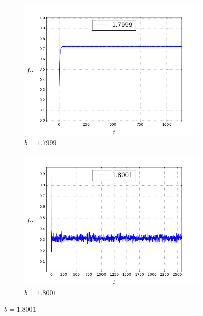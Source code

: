 \documentclass[a4paper]{article}
\begin{document}
	
	\begin{figure}[H]
		\centering
		\begin{subfigure}{.5\textwidth}
			\includegraphics[width=1\linewidth]{f1.7999.png}
			\caption{$b=1.7999$}
			\label{freq_left}
		\end{subfigure}%
		\begin{subfigure}{.5\textwidth}
			\includegraphics[width=1\linewidth]{f1.8001.png}
			\caption{$b=1.8001$}
			\label{freq_right}
		\end{subfigure}%
		

\end{figure}
\end{document}
